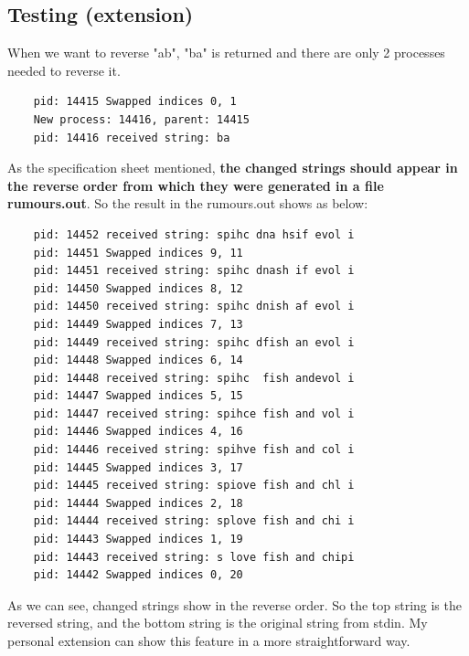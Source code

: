 \documentclass{article}
\begin{document}
\subsection{Testing (extension)}
When we want to reverse "ab", "ba" is returned and there are only 2 processes needed to reverse it.
\begin{lstlisting}
	pid: 14415 Swapped indices 0, 1 
	New process: 14416, parent: 14415 
	pid: 14416 received string: ba 
\end{lstlisting}
As the specification sheet mentioned, \textbf{the changed strings should appear in the reverse order from which they were generated in a file rumours.out}. So the result in the rumours.out shows as below: 
\begin{lstlisting}
	pid: 14452 received string: spihc dna hsif evol i  
	pid: 14451 Swapped indices 9, 11 
	pid: 14451 received string: spihc dnash if evol i  
	pid: 14450 Swapped indices 8, 12 
	pid: 14450 received string: spihc dnish af evol i  
	pid: 14449 Swapped indices 7, 13 
	pid: 14449 received string: spihc dfish an evol i  
	pid: 14448 Swapped indices 6, 14 
	pid: 14448 received string: spihc  fish andevol i  
	pid: 14447 Swapped indices 5, 15 
	pid: 14447 received string: spihce fish and vol i  
	pid: 14446 Swapped indices 4, 16 
	pid: 14446 received string: spihve fish and col i  
	pid: 14445 Swapped indices 3, 17 
	pid: 14445 received string: spiove fish and chl i  
	pid: 14444 Swapped indices 2, 18 
	pid: 14444 received string: splove fish and chi i  
	pid: 14443 Swapped indices 1, 19 
	pid: 14443 received string: s love fish and chipi  
	pid: 14442 Swapped indices 0, 20 
\end{lstlisting}
As we can see, changed strings show in the reverse order. So the top string is the reversed string, and the bottom string is the original string from stdin. My personal extension can show this feature in a more straightforward way. 
\end{document}
